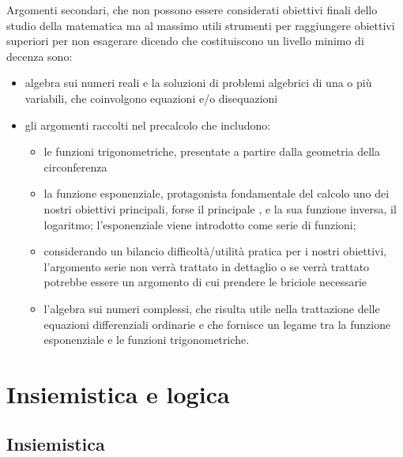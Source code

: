 \documentclass[letterpaper,10pt,italian]{jupyterBook}
\begin{document}
\sphinxAtStartPar
Argomenti secondari, che non possono essere considerati obiettivi finali dello studio della matematica ma al massimo utili strumenti per raggiungere obiettivi superiori \sphinxhyphen{} per non esagerare dicendo che costituiscono un livello minimo di decenza \sphinxhyphen{} sono:
\begin{itemize}
\item {} 
\sphinxAtStartPar
algebra sui numeri reali e la soluzioni di problemi algebrici di una o più variabili, che coinvolgono equazioni e/o disequazioni

\item {} 
\sphinxAtStartPar
gli argomenti raccolti nel precalcolo che includono:
\begin{itemize}
\item {} 
\sphinxAtStartPar
le funzioni trigonometriche, presentate a partire dalla geometria della circonferenza

\item {} 
\sphinxAtStartPar
la funzione esponenziale, protagonista fondamentale del calcolo \sphinxhyphen{} uno dei nostri obiettivi principali, forse il principale \sphinxhyphen{}, e la sua funzione inversa, il logaritmo; l’esponenziale viene introdotto come serie di funzioni;

\item {} 
\sphinxAtStartPar
considerando un bilancio difficoltà/utilità pratica per i nostri obiettivi, l’argomento serie non verrà trattato in dettaglio \sphinxhyphen{} o se verrà trattato potrebbe essere un argomento di cui prendere le briciole necessarie

\item {} 
\sphinxAtStartPar
l’algebra sui numeri complessi, che risulta utile nella trattazione delle equazioni differenziali ordinarie e che fornisce un legame tra la funzione esponenziale e le funzioni trigonometriche.

\end{itemize}

\end{itemize}





\sphinxstepscope


\part{Insiemistica e logica}

\sphinxstepscope


\chapter{Insiemistica}
\label{\detokenize{ch/set:insiemistica}}\label{\detokenize{ch/set:math-hs-set}}\label{\detokenize{ch/set::doc}}
\end{document}

